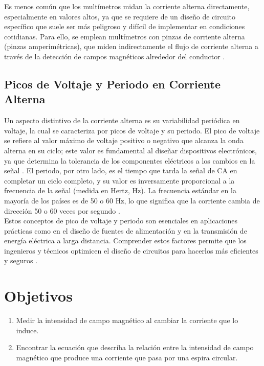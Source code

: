 \documentclass[twocolumn]{article}
\begin{document}
\noindent Es menos común que los multímetros midan la corriente alterna directamente, especialmente en valores altos, ya que se requiere de un diseño de circuito específico que suele ser más peligroso y difícil de implementar en condiciones cotidianas. Para ello, se emplean multímetros con pinzas de corriente alterna (pinzas amperimétricas), que miden indirectamente el flujo de corriente alterna a través de la detección de campos magnéticos alrededor del conductor \cite{chang2021}.

\subsection*{Picos de Voltaje y Periodo en Corriente Alterna}

Un aspecto distintivo de la corriente alterna es su variabilidad periódica en voltaje, la cual se caracteriza por picos de voltaje y su periodo. El pico de voltaje se refiere al valor máximo de voltaje positivo o negativo que alcanza la onda alterna en su ciclo; este valor es fundamental al diseñar dispositivos electrónicos, ya que determina la tolerancia de los componentes eléctricos a los cambios en la señal \cite{rodriguez2021}. El periodo, por otro lado, es el tiempo que tarda la señal de CA en completar un ciclo completo, y su valor es inversamente proporcional a la frecuencia de la señal (medida en Hertz, Hz). La frecuencia estándar en la mayoría de los países es de 50 o 60 Hz, lo que significa que la corriente cambia de dirección 50 o 60 veces por segundo \cite{perez2019}.\noindent 
\\

\noindent Estos conceptos de pico de voltaje y periodo son esenciales en aplicaciones prácticas como en el diseño de fuentes de alimentación y en la transmisión de energía eléctrica a larga distancia. Comprender estos factores permite que los ingenieros y técnicos optimicen el diseño de circuitos para hacerlos más eficientes y seguros \cite{wilson2020}.

\section{Objetivos}
\begin{enumerate}
    \item Medir la intensidad de campo magnético al cambiar la corriente que lo induce.
    \item Encontrar la ecuación que describa la relación entre la intensidad de campo magnético que produce una corriente que pasa por una espira circular. 
\end{enumerate}
\end{document}
